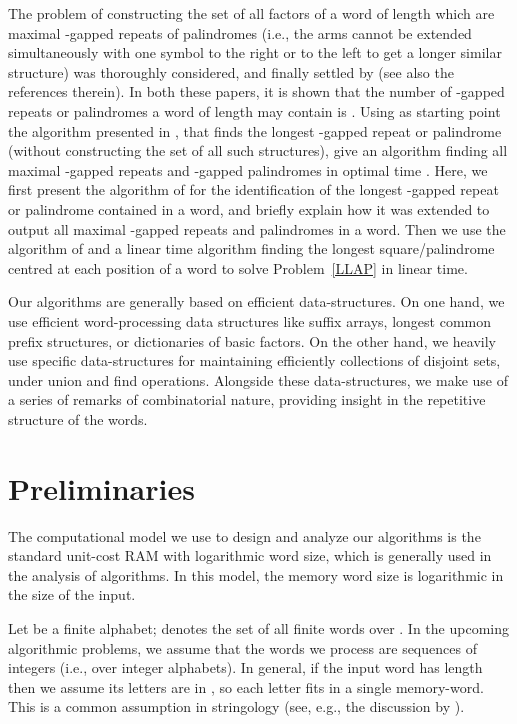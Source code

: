 \documentclass[final]{dmtcs-episciences}
\begin{document}
The problem of constructing the set  of all factors of a word of length  which are maximal -gapped repeats of palindromes (i.e., the arms cannot be extended simultaneously with one symbol to the right or to the left to get a longer similar structure) was thoroughly considered, and finally settled by \cite{CroKolKu2015,STACS2016} (see also the references therein). In both these papers, it is shown that the number of -gapped repeats or palindromes a word of length  may contain is . Using as starting point the algorithm presented in \cite{fct}, that finds the longest -gapped repeat or palindrome (without constructing the set of all such structures), \cite{STACS2016} give an algorithm finding all maximal -gapped repeats and -gapped palindromes in optimal time .  Here, we first present the algorithm of \cite{fct} for the identification of the longest -gapped repeat or palindrome contained in a word, and briefly explain how it was extended to output all maximal -gapped repeats and palindromes in a word. Then we use the algorithm of \cite{STACS2016} and a linear time algorithm finding the longest square/palindrome centred at each position of a word to solve Problem~\ref{LLAP} in linear time. 

Our algorithms are generally based on efficient data-structures. On one hand, we use efficient word-processing data structures like suffix arrays, longest common prefix structures, or dictionaries of basic factors. On the other hand, we heavily use specific data-structures for maintaining efficiently collections of disjoint sets, under union and find ope\-rations. Alongside these data-structures, we make use of a series of remarks of combinatorial nature, providing insight in the repetitive structure of the words. 

\section{Preliminaries}
The computational model we use to design and analyze our algorithms is the standard unit-cost RAM with logarithmic word size, which is generally used in the analysis of algorithms. In this model, the memory word size is logarithmic in the size of the input. 

Let  be a finite alphabet;  denotes the set of all finite words over . In the upcoming algorithmic problems, we assume that the words we process are sequences of integers (i.e., over integer alphabets). In general, if the input word has length  then we assume its letters are in , so each letter fits in a single memory-word. This is a common assumption in stringology (see, e.g., the discussion by \cite{KaSaBu06}).
\end{document}
